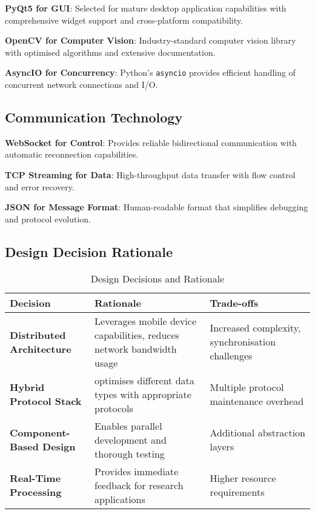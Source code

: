 \documentclass[11pt,a4paper]{report}
\begin{document}
\textbf{PyQt5 for GUI}: Selected for mature desktop application capabilities with comprehensive widget support and cross-platform compatibility.

\textbf{OpenCV for Computer Vision}: Industry-standard computer vision library with optimised algorithms and extensive documentation.

\textbf{AsyncIO for Concurrency}: Python’s \texttt{asyncio} provides efficient handling of concurrent network connections and I/O.

\subsection{Communication Technology}

\textbf{WebSocket for Control}: Provides reliable bidirectional communication with automatic reconnection capabilities.

\textbf{TCP Streaming for Data}: High-throughput data transfer with flow control and error recovery.

\textbf{JSON for Message Format}: Human-readable format that simplifies debugging and protocol evolution.

\subsection{Design Decision Rationale}

\begin{table}[ht]
\centering
\caption{Design Decisions and Rationale}
\begin{tabularx}{\textwidth}{L L L}
\toprule
\textbf{Decision} & \textbf{Rationale} & \textbf{Trade-offs} \\
\midrule
\textbf{Distributed Architecture} & Leverages mobile device capabilities, reduces network bandwidth usage & Increased complexity, synchronisation challenges \\
\textbf{Hybrid Protocol Stack} & optimises different data types with appropriate protocols & Multiple protocol maintenance overhead \\
\textbf{Component-Based Design} & Enables parallel development and thorough testing & Additional abstraction layers \\
\textbf{Real-Time Processing} & Provides immediate feedback for research applications & Higher resource requirements \\
\bottomrule
\end{tabularx}
\end{table}
\end{document}
